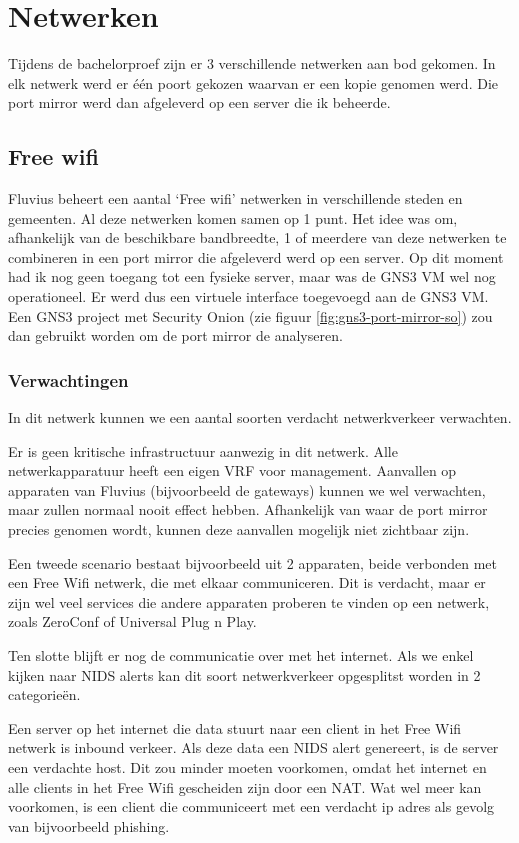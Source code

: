 \documentclass[a4paper,12pt]{report}
\begin{document}
\section{Netwerken}
Tijdens de bachelorproef zijn er 3 verschillende netwerken aan bod gekomen.
In elk netwerk werd er één poort gekozen waarvan er een kopie genomen werd.
Die port mirror werd dan afgeleverd op een server die ik beheerde.

\subsection{Free wifi}
Fluvius beheert een aantal `Free wifi' netwerken in verschillende steden en gemeenten.
Al deze netwerken komen samen op 1 punt.
Het idee was om, afhankelijk van de beschikbare bandbreedte, 1 of meerdere van deze netwerken te combineren in een port mirror die afgeleverd werd op een server.
Op dit moment had ik nog geen toegang tot een fysieke server, maar was de GNS3 VM wel nog operationeel.
Er werd dus een virtuele interface toegevoegd aan de GNS3 VM.
Een GNS3 project met Security Onion (zie figuur \ref{fig:gns3-port-mirror-so}) zou dan gebruikt worden om de port mirror de analyseren.

\subsubsection{Verwachtingen}
In dit netwerk kunnen we een aantal soorten verdacht netwerkverkeer verwachten.

Er is geen kritische infrastructuur aanwezig in dit netwerk.
Alle netwerkapparatuur heeft een eigen VRF voor management.
Aanvallen op apparaten van Fluvius (bijvoorbeeld de gateways) kunnen we wel verwachten, maar zullen normaal nooit effect hebben.
Afhankelijk van waar de port mirror precies genomen wordt, kunnen deze aanvallen mogelijk niet zichtbaar zijn.

Een tweede scenario bestaat bijvoorbeeld uit 2 apparaten, beide verbonden met een Free Wifi netwerk, die met elkaar communiceren.
Dit is verdacht, maar er zijn wel veel services die andere apparaten proberen te vinden op een netwerk, zoals ZeroConf of Universal Plug n Play.

Ten slotte blijft er nog de communicatie over met het internet.
Als we enkel kijken naar NIDS alerts kan dit soort netwerkverkeer opgesplitst worden in 2 categorieën.

Een server op het internet die data stuurt naar een client in het Free Wifi netwerk is inbound verkeer.
Als deze data een NIDS alert genereert, is de server een verdachte host.
Dit zou minder moeten voorkomen, omdat het internet en alle clients in het Free Wifi gescheiden zijn door een NAT.
Wat wel meer kan voorkomen, is een client die communiceert met een verdacht ip adres als gevolg van bijvoorbeeld phishing.
\end{document}
